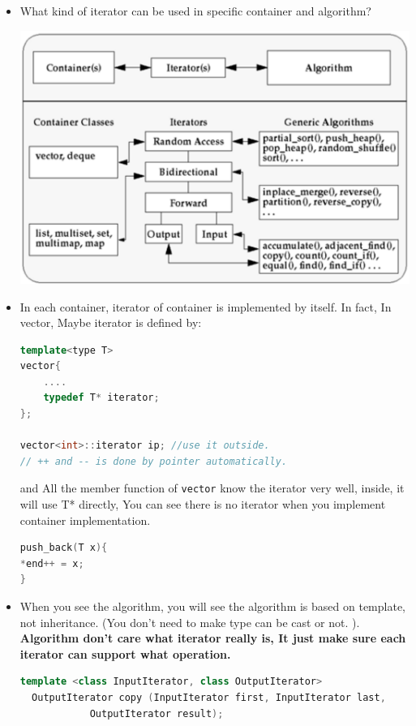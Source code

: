 \documentclass[a4paper,11pt,twoside]{book}
\begin{document}
\begin{itemize}
\item What kind of iterator can be used in specific container and algorithm?
\begin{center}
	  \includegraphics[scale=0.56]{pics/container_it.png}
\end{center}

\item In each container, iterator of container is implemented by itself. In fact, In vector, Maybe iterator is defined by:
\begin{lstlisting}[frame=single, language=c++]
template<type T>
vector{
	....
	typedef T* iterator;
};

vector<int>::iterator ip; //use it outside.
// ++ and -- is done by pointer automatically.
\end{lstlisting}

and All the member function of \texttt{vector} know the iterator very well, inside, it will use T* directly, You can see there is no iterator when you implement container implementation.
\begin{lstlisting}[frame=single, language=c++]
push_back(T x){
*end++ = x;
}  
\end{lstlisting}

	\item When you see the algorithm,  you will see the algorithm is based on template, not inheritance. (You don't need to make type can be cast or not. ). \textbf{Algorithm don't care what iterator really is, It just make sure each iterator can support what operation. }
\begin{lstlisting}[frame=single, language=c++]
template <class InputIterator, class OutputIterator>
  OutputIterator copy (InputIterator first, InputIterator last,
            OutputIterator result);
\end{lstlisting}



\end{itemize}
\end{document}
